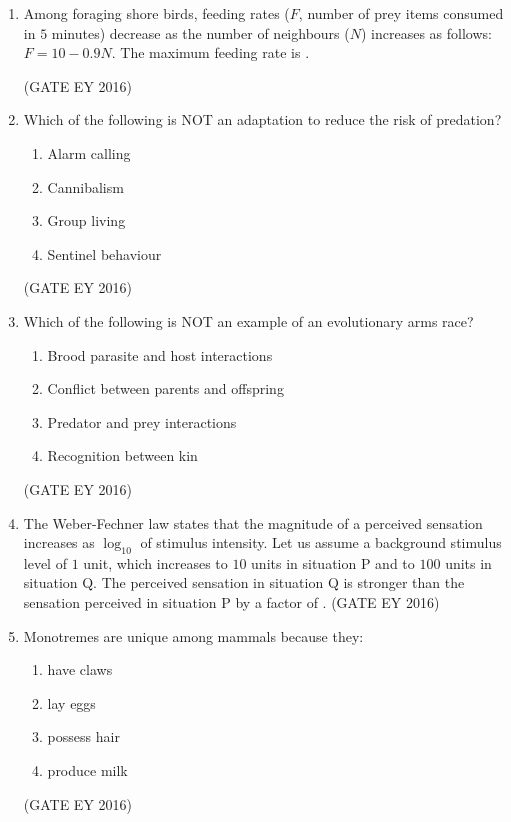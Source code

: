 \documentclass[journal]{IEEEtran}
\begin{document}
\begin{enumerate}[label=Q.\arabic*.]
\item Among foraging shore birds, feeding rates ($F$, number of prey items consumed in $5$ minutes) decrease as the number of neighbours ($N$) increases as follows: $F = 10 - 0.9N$. The maximum feeding rate is \underline{\hspace{3cm}}.

\hfill{(GATE EY 2016)}

\item Which of the following is NOT an adaptation to reduce the risk of predation?
\begin{multicols}{2}
\begin{enumerate}
    \item Alarm calling
    \item Cannibalism
    \item Group living
    \item Sentinel behaviour
\end{enumerate}
\end{multicols}
\hfill{(GATE EY 2016)}

\item Which of the following is NOT an example of an evolutionary arms race?
\begin{enumerate}
    \item Brood parasite and host interactions
    \item Conflict between parents and offspring
    \item Predator and prey interactions
    \item Recognition between kin
\end{enumerate}
\hfill{(GATE EY 2016)}

\item The Weber-Fechner law states that the magnitude of a perceived sensation increases as $\log_{10}$ of stimulus intensity. Let us assume a background stimulus level of $1$ unit, which increases to $10$ units in situation P and to $100$ units in situation Q. The perceived sensation in situation Q is stronger than the sensation perceived in situation P by a factor of \underline{\hspace{3cm}}.
\hfill{(GATE EY 2016)}

\item Monotremes are unique among mammals because they:
\begin{multicols}{2}
\begin{enumerate}
    \item have claws
    \item lay eggs
    \item possess hair
    \item produce milk
\end{enumerate}
\end{multicols}
\hfill{(GATE EY 2016)}


\end{enumerate}
\end{document}
